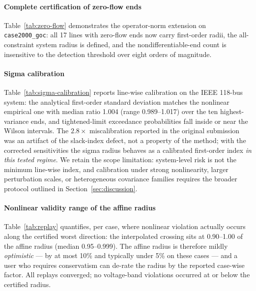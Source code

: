 \documentclass[11pt]{article}
\begin{document}


\paragraph{Complete certification of zero-flow ends}
Table~\ref{tab:zero-flow} demonstrates the operator-norm extension on
\texttt{case2000\_goc}: all 17 lines with zero-flow ends now carry
first-order radii, the all-constraint system radius is defined, and the
nondifferentiable-end count is insensitive to the detection threshold over
eight orders of magnitude.



\paragraph{Sigma calibration}
Table~\ref{tab:sigma-calibration} reports line-wise calibration on the IEEE
118-bus system: the analytical first-order standard deviation matches the
nonlinear empirical one with median ratio 1.004 (range 0.989--1.017) over
the ten highest-variance ends, and tightened-limit exceedance probabilities
fall inside or near the Wilson intervals.  The $2.8\times$ miscalibration
reported in the original submission was an artifact of the slack-index
defect, not a property of the method; with the corrected sensitivities the
sigma radius behaves as a calibrated first-order index \emph{in this tested
regime}.  We retain the scope limitation: system-level risk is not the
minimum line-wise index, and calibration under strong nonlinearity, larger
perturbation scales, or heterogeneous covariance families requires the
broader protocol outlined in Section~\ref{sec:discussion}.



\paragraph{Nonlinear validity range of the affine radius}
Table~\ref{tab:replay} quantifies, per case, where nonlinear violation
actually occurs along the certified worst direction: the interpolated
crossing sits at 0.90--1.00 of the affine radius (median 0.95--0.999).  The
affine radius is therefore mildly \emph{optimistic} --- by at most 10\% and
typically under 5\% on these cases --- and a user who requires conservatism
can de-rate the radius by the reported case-wise factor.  All replays
converged; no voltage-band violations occurred at or below the certified
radius.
\end{document}
